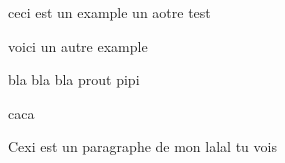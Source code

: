 \beguindocument
ceci est un example
un aotre test

voici un autre example

bla bla bla
prout
pipi


caca


Cexi est un paragraphe de mon lalal tu vois